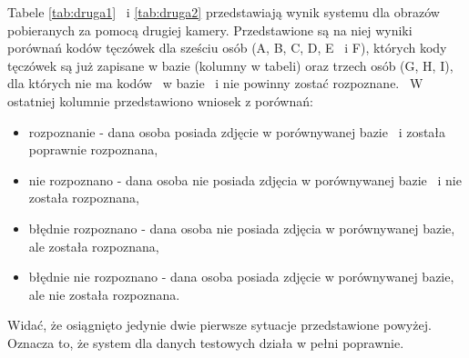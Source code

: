 Tabele \ref{tab:druga1} ~i \ref{tab:druga2} przedstawiają wynik systemu dla obrazów pobieranych za pomocą drugiej kamery. Przedstawione są na niej wyniki porównań kodów tęczówek dla sześciu osób (A, B, C, D, E ~i F), których kody tęczówek są już zapisane w bazie (kolumny w tabeli) oraz trzech osób (G, H, I), dla których nie ma kodów ~w bazie ~i nie powinny zostać rozpoznane. ~W ostatniej kolumnie przedstawiono wniosek z porównań:
\begin{itemize}
\item rozpoznanie - dana osoba posiada zdjęcie w porównywanej bazie ~i została poprawnie rozpoznana,
\item nie rozpoznano - dana osoba nie posiada zdjęcia w porównywanej bazie ~i nie została rozpoznana,
\item błędnie rozpoznano - dana osoba nie posiada zdjęcia w porównywanej bazie, ale została rozpoznana,
\item błędnie nie rozpoznano - dana osoba posiada zdjęcie w porównywanej bazie, ale nie została rozpoznana.
\end{itemize}

Widać, że osiągnięto jedynie dwie pierwsze sytuacje przedstawione powyżej. Oznacza to, że system dla danych testowych działa w pełni poprawnie.

